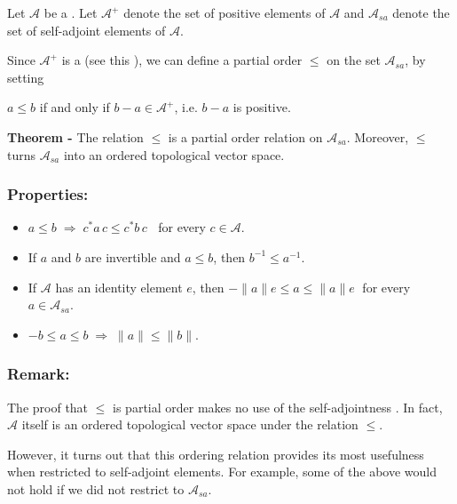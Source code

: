 \documentclass[12pt]{article}
\begin{document}
Let $\mathcal{A}$ be a . Let $\mathcal{A}^+$ denote the set of positive elements of $\mathcal{A}$ and $\mathcal{A}_{sa}$ denote the set of self-adjoint elements of $\mathcal{A}$.

Since $\mathcal{A}^+$ is a  (see this ), we can define a partial order $\leq$ on the set $\mathcal{A}_{sa}$, by setting
\begin{center}
$a\leq b$ if and only if $b-a \in \mathcal{A}^+$, i.e. $b-a$ is positive.
\end{center} 

{\bf Theorem -} The relation $\leq$ is a partial order relation on $\mathcal{A}_{sa}$. Moreover, $\leq$ turns $\mathcal{A}_{sa}$ into an ordered topological vector space.

\subsubsection{Properties:}

\begin{itemize}
\item $a\leq b \;\Rightarrow\; c^*a\,c\leq c^*b\,c\;\;$ for every $c \in \mathcal{A}$.
\item If $a$ and $b$ are invertible and $a \leq b$, then $b^{-1} \leq a^{-1}$.
\item If $\mathcal{A}$ has an identity element $e$, then $-\|a\|e \leq a \leq \|a\|e\;$ for every $a \in \mathcal{A}_{sa}$.
\item $-b \leq a \leq b \;\Rightarrow \;\|a\| \leq \|b\|$.
\end{itemize}

\subsubsection{Remark:}
The proof that $\leq$ is partial order makes no use of the self-adjointness . In fact, $\mathcal{A}$ itself is an ordered topological vector space under the relation $\leq$.

However, it turns out that this ordering relation provides its most usefulness when restricted to self-adjoint elements. For example, some of the above  would not hold if we did not restrict to $\mathcal{A}_{sa}$.
\end{document}
